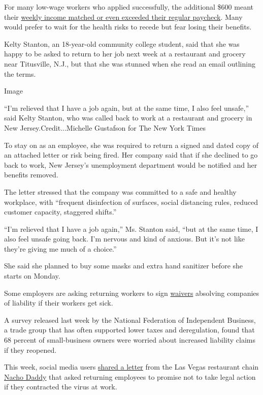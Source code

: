 For many low-wage workers who applied successfully, the additional \$600
meant their
\href{https://www.nytimes3xbfgragh.onion/interactive/2020/04/23/business/economy/unemployment-benefits-stimulus-coronavirus.html}{weekly
income matched or even exceeded their regular paycheck}. Many would
prefer to wait for the health risks to recede but fear losing their
benefits.

Kelty Stanton, an 18-year-old community college student, said that she
was happy to be asked to return to her job next week at a restaurant and
grocery near Titusville, N.J., but that she was stunned when she read an
email outlining the terms.

Image

``I'm relieved that I have a job again, but at the same time, I also
feel unsafe,'' said Kelty Stanton, who was called back to work at a
restaurant and grocery in New Jersey.Credit...Michelle Gustafson for The
New York Times

To stay on as an employee, she was required to return a signed and dated
copy of an attached letter or risk being fired. Her company said that if
she declined to go back to work, New Jersey's unemployment department
would be notified and her benefits removed.

The letter stressed that the company was committed to a safe and healthy
workplace, with ``frequent disinfection of surfaces, social distancing
rules, reduced customer capacity, staggered shifts.''

``I'm relieved that I have a job again,'' Ms. Stanton said, ``but at the
same time, I also feel unsafe going back. I'm nervous and kind of
anxious. But it's not like they're giving me much of a choice.''

She said she planned to buy some masks and extra hand sanitizer before
she starts on Monday.

Some employers are asking returning workers to sign
\href{https://twitter.com/Gilly0n/status/1258873334827061248?s=20}{waivers}
absolving companies of liability if their workers get sick.

A survey released last week by the National Federation of Independent
Business, a trade group that has often supported lower taxes and
deregulation, found that 68 percent of small-business owners were
worried about increased liability claims if they reopened.

This week, social media users
\href{https://twitter.com/Gilly0n/status/1258873334827061248?s=20}{shared
a letter} from the Las Vegas restaurant chain
\href{https://twitter.com/tripple_OD/status/1259698602185764865?s=20}{Nacho
Daddy} that asked returning employees to promise not to take legal
action if they contracted the virus at work.

